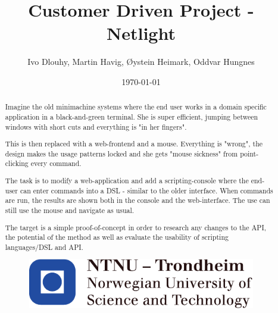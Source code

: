 \documentclass[10pt,a4paper,oneside]{report}
\begin{document}
\title{Customer Driven Project - Netlight}
\author{Ivo Dlouhy, Martin Havig, Øystein Heimark, Oddvar Hungnes}
\date{\today}
\maketitle



\begin{abstract}

Imagine the old minimachine systems where the end user works in a domain specific application in a black-and-green terminal. She is super efficient, jumping between windows with short cuts and everything is "in her fingers".
 
This is then replaced with a web-frontend and a mouse. Everything is "wrong", the design makes the usage patterns locked and she gets "mouse sickness" from point-clicking every command.
 
The task is to modify a web-application and add a scripting-console where the end-user can enter commands into a DSL - similar to the older interface. When commands are run, the results are shown both in the console and the web-interface. The use can still use the mouse and navigate as usual.
 
The target is a simple proof-of-concept in order to research any changes to the API, the potential of the method as well as evaluate the usability of scripting languages/DSL and API.

\begin{figure}
\centering
\includegraphics{image/logo-ntnu.pdf}
\end{figure}

\end{abstract}

\setcounter{tocdepth}{4}
\tableofcontents
\clearpage
\listoffigures


\end{document}
